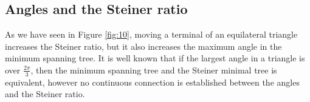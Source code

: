 \documentclass{mpaper}
\begin{document}
\subsection{Angles and the Steiner ratio}

As we have seen in Figure \ref{fig:10}, moving a terminal of an equilateral triangle increases the Steiner ratio, but it also increases the maximum angle in the minimum spanning tree. It is well known that if the largest angle in a triangle is over $\frac{2\pi}{3}$, then the minimum spanning tree and the Steiner minimal tree is equivalent, however no  continuous connection is established between the angles and the Steiner ratio.
\end{document}
